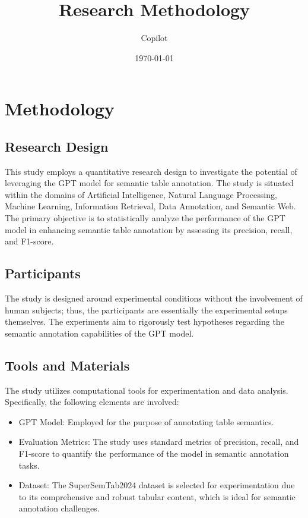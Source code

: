 \documentclass{article}
\title{Research Methodology}
\author{Copilot}
\date{\today}
\begin{document}
\maketitle

\section{Methodology}

\subsection{Research Design}
This study employs a quantitative research design to investigate the potential of leveraging the GPT model for semantic table annotation. The study is situated within the domains of Artificial Intelligence, Natural Language Processing, Machine Learning, Information Retrieval, Data Annotation, and Semantic Web. The primary objective is to statistically analyze the performance of the GPT model in enhancing semantic table annotation by assessing its precision, recall, and F1-score.

\subsection{Participants}
The study is designed around experimental conditions without the involvement of human subjects; thus, the participants are essentially the experimental setups themselves. The experiments aim to rigorously test hypotheses regarding the semantic annotation capabilities of the GPT model.

\subsection{Tools and Materials}
The study utilizes computational tools for experimentation and data analysis. Specifically, the following elements are involved:

\begin{itemize}
    \item GPT Model: Employed for the purpose of annotating table semantics.
    \item Evaluation Metrics: The study uses standard metrics of precision, recall, and F1-score to quantify the performance of the model in semantic annotation tasks.
    \item Dataset: The SuperSemTab2024 dataset is selected for experimentation due to its comprehensive and robust tabular content, which is ideal for semantic annotation challenges.
\end{itemize}
\end{document}
